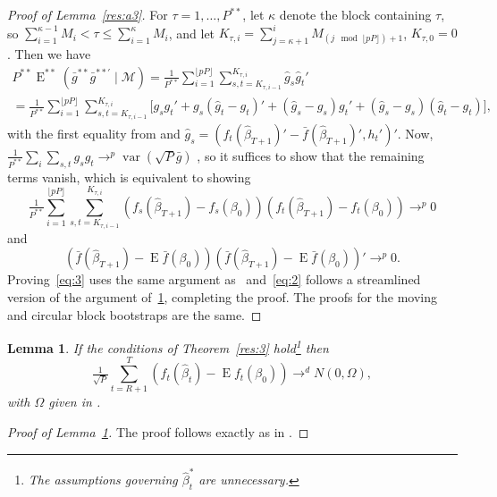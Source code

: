 \documentclass[10pt,fleqn,draft]{article}
\newtheorem{lema}{Lemma}[section]
\theoremstyle{definition}
\DeclareMathOperator{\E}{E}
\DeclareMathOperator{\var}{var}
\begin{document}
\begin{proof}[Proof of Lemma~\ref{res:a3}]
  For $\tau = 1,\dots,P^{**}$, let $\kappa$ denote the block
  containing $\tau$, so $\sum_{i=1}^{\kappa-1} M_i < \tau \leq
  \sum_{i=1}^{\kappa} M_i$, and let $K_{\tau,i} = \sum_{j=\kappa+1}^i
  M_{(j \mod \lfloor p P \rfloor) + 1}$, $K_{\tau,0} = 0$.  Then we have
  \begin{multline}
    P^{**} \E^{**}(\bar{g}^{**} \bar{g}^{**\prime} \mid \mathcal{M})
    = \tfrac{1}{P^{**}} \sum_{i=1}^{\lfloor p P \rfloor} 
    \sum_{s,t=K_{\tau,i-1}}^{K_{\tau,i}} \hat{g}_s \hat{g}_t' 
    \\ = \tfrac{1}{P^{**}} \sum_{i=1}^{\lfloor p P \rfloor}
    \sum_{s,t=K_{\tau,i-1}}^{K_{\tau,i}} \big[g_s g_t' + g_s(\hat{g}_t
    - g_{t})' + (\hat{g}_s - g_{s}) g_{t}' + (\hat{g}_s -
    g_{s})(\hat{g}_t - g_{t}) \big],
  \end{multline}
  with the first equality from \citet{Cal:11d} and $\hat{g}_s =
  (f_t(\hat{\beta}_{T+1})' - \bar f(\hat{\beta}_{T+1})', h_t')'$.
  Now, $\frac{1}{P^{**}} \sum_i \sum_{s,t} g_s g_t \to^p \var(\sqrt{P} \bar{g})$
  \citep[Lemma~5]{Cal:11d}, so it suffices to show that the remaining
  terms vanish, which is equivalent to showing
  \begin{equation}\label{eq:3}
    \tfrac{1}{P^{**}} \sum_{i=1}^{\lfloor p P \rfloor}\sum_{s,t =
      K_{\tau,i-1}}^{K_{\tau,i}} (f_s(\hat{\beta}_{T+1}) -
    f_s(\beta_0)) (f_t(\hat{\beta}_{T+1}) - f_t(\beta_0))
    \to^p 0
  \end{equation}
  and
  \begin{equation}\label{eq:2}
    (\bar{f}(\hat{\beta}_{T+1}) - \E
    \bar{f}(\beta_0)) (\bar{f}(\hat{\beta}_{T+1}) - \E
    \bar{f}(\beta_0))' \to^p 0.
  \end{equation}
  Proving~\eqref{eq:3} uses the same argument as~\citet[Lemma
  A.3]{Mcc:00} and~\eqref{eq:2} follows a streamlined version of the
  argument of~\ref{res:a5}, completing the proof.  The proofs for the
  moving and circular block bootstraps are the same.
\end{proof}

\begin{lema}\label{res:a5}
  If the conditions of Theorem~\ref{res:3} hold\footnote{The
    assumptions governing $\hat{\beta}_t^{*}$ are unnecessary.} then
  \begin{equation}
    \tfrac{1}{\sqrt{P}} \sum_{t=R+1}^T
    (f_{t}(\hat{\beta}_{t}) - \E f_{t}(\beta_{0})) \to^d N(0, \Omega),
  \end{equation}
  with $\Omega$ given in \citet[Theorem 2.3.1]{Mcc:00}.
\end{lema}
\begin{proof}[Proof of Lemma~\ref{res:a5}]
  The proof follows exactly as in \citet[Theorem 2.3.1]{Mcc:00}.
\end{proof}
\end{document}
